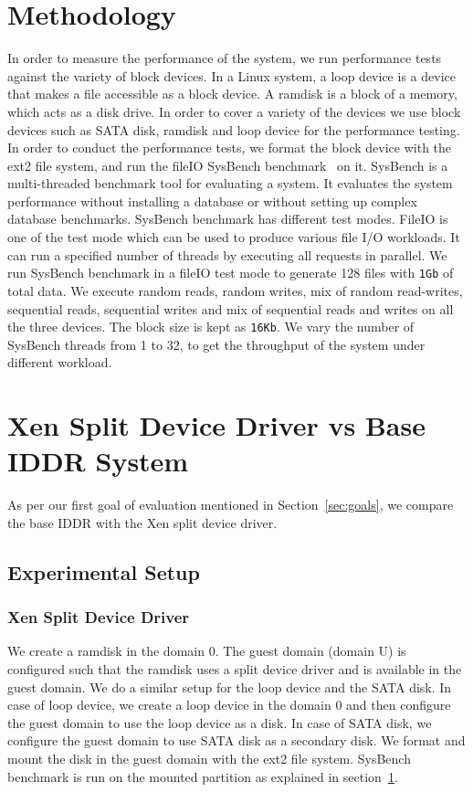 \section{Methodology}
\label{sec:methodology}
In order to measure the performance of the system, we run performance tests against the variety of block devices. In a Linux system, a loop device is a device that makes a file accessible as a block device. A ramdisk is a block of a memory, which acts as a disk drive. In order to cover a variety of the devices we use block devices such as SATA disk, ramdisk and loop device for the performance testing.
\\[3mm]
In order to conduct the performance tests, we format the block device with the ext2 file system, and run the fileIO SysBench benchmark~\cite{sysbench} on it. SysBench is a multi-threaded benchmark tool for evaluating a system. It evaluates the system performance without installing a database or without setting up complex database benchmarks. SysBench benchmark has different test modes. FileIO is one of the test mode which can be used to produce various file I/O workloads. It can run a specified number of threads by executing all requests in parallel. We run SysBench benchmark in a fileIO test mode to generate 128 files with \texttt{1Gb} of total data. We execute random reads, random writes, mix of random read-writes, sequential reads, sequential writes and mix of sequential reads and writes on all the three devices. The block size is kept as \texttt{16Kb}. We vary the number of SysBench threads from 1 to 32, to get the throughput of the system under different workload. 

\section{Xen Split Device Driver vs Base IDDR System}
As per our first goal of evaluation mentioned in Section~\ref{sec:goals}, we compare the base IDDR with the Xen split device driver. 

\subsection*{Experimental Setup}

\subsubsection*{Xen Split Device Driver}
We create a ramdisk in the domain 0. The guest domain (domain U) is configured such that the ramdisk uses a split device driver and is available in the guest domain. We do a similar setup for the loop device and the SATA disk. In case of loop device, we create a loop device in the domain 0 and then configure the guest domain to use the loop device as a disk. In case of SATA disk, we configure the guest domain to use SATA disk as a secondary disk. We format and mount the disk in the guest domain with the ext2 file system. SysBench benchmark is run on the mounted partition as explained in section~\ref{sec:methodology}.

